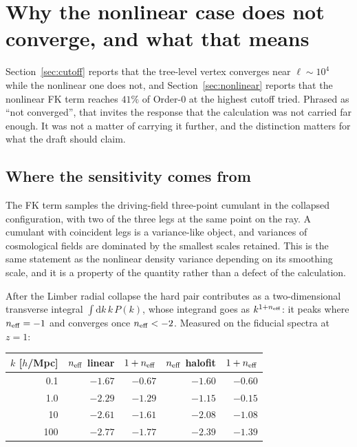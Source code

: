 \section{Why the nonlinear case does not converge, and what that means}
\label{sec:uv}

Section~\ref{sec:cutoff} reports that the tree-level vertex converges near
$\ell\sim10^4$ while the nonlinear one does not, and Section~\ref{sec:nonlinear}
reports that the nonlinear FK term reaches $41\%$ of Order-0 at the highest
cutoff tried. Phrased as ``not converged'', that invites the response that
the calculation was not carried far enough. It was not a matter of carrying
it further, and the distinction matters for what the draft should claim.

\subsection{Where the sensitivity comes from}

The FK term samples the driving-field three-point cumulant in the collapsed
configuration, with two of the three legs at the same point on the ray. A
cumulant with coincident legs is a variance-like object, and variances of
cosmological fields are dominated by the smallest scales retained. This is
the same statement as the nonlinear density variance depending on its
smoothing scale, and it is a property of the quantity rather than a defect
of the calculation.

After the Limber radial collapse the hard pair contributes as a
two-dimensional transverse integral $\int\!\mathrm{d}k\,k\,P(k)$, whose
integrand goes as $k^{1+n_{\rm eff}}$: it peaks where $n_{\rm eff}=-1$ and
converges once $n_{\rm eff}<-2$. Measured on the fiducial spectra at $z=1$:

\begin{center}
\begin{tabular}{rrrrr}
\toprule
$k$ [$h$/Mpc] & $n_{\rm eff}$ linear & $1+n_{\rm eff}$ & $n_{\rm eff}$ halofit & $1+n_{\rm eff}$ \\
\midrule
0.1 & $-1.67$ & $-0.67$ & $-1.60$ & $-0.60$ \\
1.0 & $-2.29$ & $-1.29$ & $-1.15$ & $-0.15$ \\
10  & $-2.61$ & $-1.61$ & $-2.08$ & $-1.08$ \\
100 & $-2.77$ & $-1.77$ & $-2.39$ & $-1.39$ \\
\bottomrule
\end{tabular}
\end{center}

